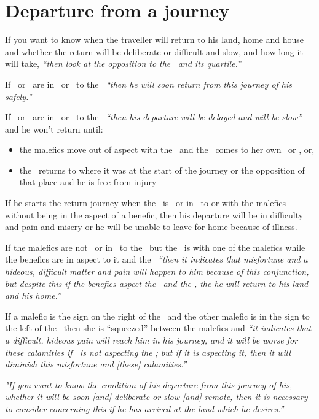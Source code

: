 \section{Departure from a journey}
If you want to know when the traveller will return to his land, home and house and whether the return will be deliberate or difficult and slow, and how long it will take, \textsl{``then look at the opposition to the \Sun\, and its quartile.''}

If \Jupiter\, or \Venus\, are in \Square\ or \Opposition\, to the \Sun\, \textsl{``then he will soon return from this journey of his safely.''}

If \Saturn\, or \Mars\, are in \Square\, or \Opposition\, to the \Sun\, \textsl{``then his departure will be delayed and will be slow''} and he won't return until:
\begin{itemize}[topsep=0em,itemsep=0em]
\item the malefics move out of aspect with the \Moon\, and the \Moon\, comes to her own \Square\, or \Opposition, or,
\item the \Sun\, returns to where it was at the start of the journey or the opposition of that place and he is free from injury
\end{itemize}

If he starts the return journey when the \Moon\, is \Square\, or in \Opposition\, to or with the malefics without being in the aspect of a benefic, then his departure will be in difficulty and pain and misery or he will be unable to leave for home because of illness.

If the malefics are not \Square\, or in \Opposition\, to the \Moon\, but the \Moon\, is with one of the malefics while the benefics are in aspect to it and the \Sun\, \textsl{``then it indicates that misfortune and a hideous, difficult matter and pain will happen to him because of this conjunction, but despite this if the benefics aspect the \Sun\, and the \Moon, the he will return to his land and his home.''}

If a malefic is the sign on the right of the \Moon\, and the other malefic is in the sign to the left of the \Moon\, then she is ``squeezed'' between the malefics and \textsl{``it indicates that a difficult, hideous pain will reach him in his journey, and it will be worse for these calamities if \Jupiter\, is not aspecting the \Moon; but if it is aspecting it, then it will diminish this misfortune and [these] calamities.''}

\textsl{"If you want to know the condition of his departure from this journey of his, whether it will be soon [and] deliberate or slow [and] remote, then it is necessary to consider concerning this if he has arrived at the land which he desires.''}

